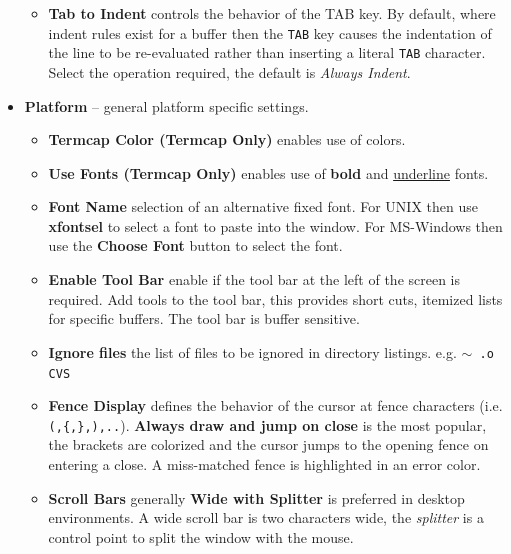 \documentclass[11pt,a4paper,pdftex]{article}
\begin{document}
\begin{itemize}
\begin{itemize}
\begin{itemize}
      \end{itemize}

      \item \textbf{Tab to Indent} controls the behavior of the TAB key. By
      default, where indent rules exist for a buffer then the \texttt{TAB} key
      causes the indentation of the line to be re-evaluated rather than
      inserting a literal \texttt{TAB} character. Select the operation
      required, the default is \textit{Always Indent}.

    \end{itemize}

    \item \textbf{Platform} -- general platform specific settings.

    \begin{itemize}

      \item \textbf{Termcap Color (Termcap Only)} enables use of colors.

      \item \textbf{Use Fonts (Termcap Only)} enables use of \textbf{bold} and
      \underline{underline} fonts.

      \item \textbf{Font Name} selection of an alternative fixed font. For
      UNIX then use \textbf{xfontsel} to select a font to paste into the
      window. For MS-Windows then use the \textbf{Choose Font} button to
      select the font.

      \item \textbf{Enable Tool Bar} enable if the tool bar at the left of the
      screen is required. Add tools to the tool bar, this provides short cuts,
      itemized lists for specific buffers. The tool bar is buffer sensitive.

      \item \textbf{Ignore files} the list of files to be ignored in directory
      listings. e.g. \texttt{$\sim$ .o CVS}

      \item \textbf{Fence Display} defines the behavior of the cursor at fence
      characters (i.e. \texttt{(,\{,\},),..}). \textbf{Always draw and jump on
      close} is the most popular, the brackets are colorized and the cursor
      jumps to the opening fence on entering a close. A miss-matched fence is
      highlighted in an error color.

      \item \textbf{Scroll Bars} generally \textbf{Wide with Splitter} is
      preferred in desktop environments. A wide scroll bar is two characters
      wide, the \textit{splitter} is a control point to split the window with
      the mouse.


\end{itemize}
\end{itemize}
\end{document}
